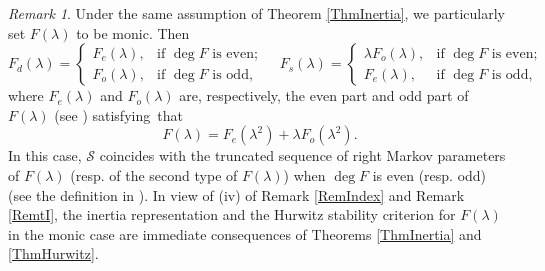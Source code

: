 \documentclass[12pt,reqno]{amsart}
\theoremstyle{plain}
\numberwithin{equation}{section}
\theoremstyle{remark}
\newtheorem{remark}[theorem]{Remark}
\begin{document}
\begin{remark}\label{RemReduction}
Under the same assumption of Theorem \ref{ThmInertia}, we particularly set $F(\lambda)$ to be monic.
Then 
$$
F_d(\lambda)=\begin{cases}
F_e(\lambda), & \mbox{if }\deg F\mbox{ is even};\\
F_o(\lambda), & \mbox{if }\deg F\mbox{ is odd},
 \end{cases}\quad
 F_s(\lambda)=\begin{cases}
\lambda F_o(\lambda), & \mbox{if }\deg F\mbox{ is even};\\
F_e(\lambda), & \mbox{if }\deg F\mbox{ is odd},
 \end{cases}
$$
where $F_e(\lambda)$ and $F_o(\lambda)$ are, respectively, the even part and odd part of $F(\lambda)$ (see \cite[Definition 2.1]{XD}) satisfying~that
$$
F(\lambda)=F_e(\lambda^2)+\lambda F_o(\lambda^2).
$$
In this case, $\mathscr S$ coincides with the truncated sequence of right Markov parameters of $F(\lambda)$ (resp. of the second type of $F(\lambda)$) when $\deg F$ is even (resp. odd) (see the definition in \cite[Definition 2.2]{XD}). 
In view of (iv) of Remark \ref{RemIndex} and Remark \ref{RemtI}, the inertia representation  \cite[Theorem 3.5]{XD} and the Hurwitz stability criterion \cite[Theorem 4.4]{XD} for $F(\lambda)$ in the monic case are immediate consequences of Theorems \ref{ThmInertia} and 
\ref{ThmHurwitz}.
\end{remark}


\end{document}
